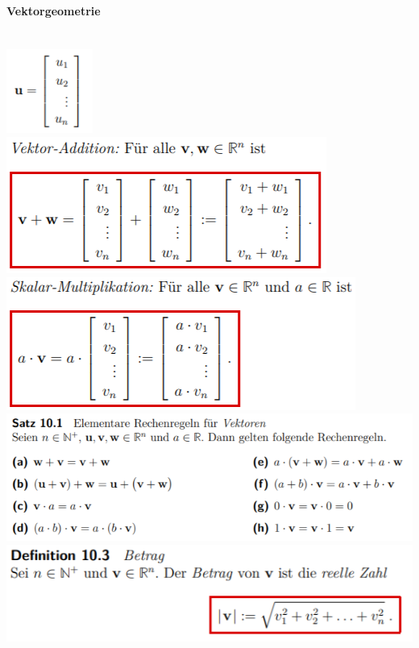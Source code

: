 \paragraph{Vektorgeometrie}\mbox{}\\
\noindent
\includegraphics[width=80pt]{./images/vek.png}\linebreak
\includegraphics[width=\columnwidth]{./images/vek1.png}
\includegraphics[width=\columnwidth]{./images/vek2.png}
\includegraphics[width=\columnwidth]{./images/vek3.png}
\includegraphics[width=\columnwidth]{./images/vek4.png}
